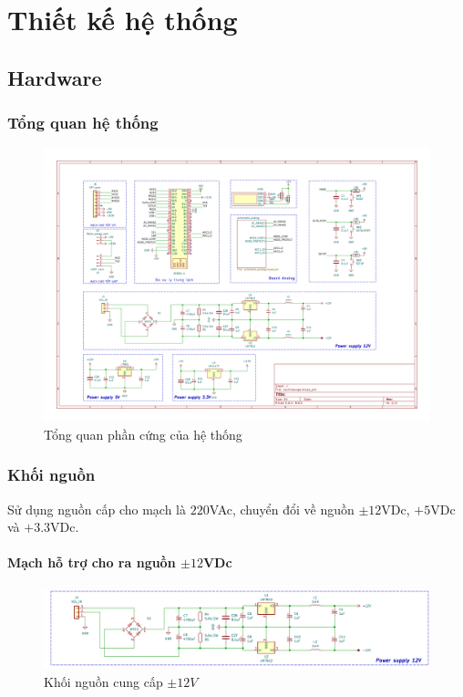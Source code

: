 \fontsize{13}{14}\selectfont
\chapter{Thiết kế hệ thống}
\newpage
\section{Hardware}
	\subsection{Tổng quan hệ thống}
	\begin{figure}[H]
		\includegraphics[width=\linewidth]{./picture/over_hardware.pdf}
		\caption{Tổng quan phần cứng của hệ thống}
		\label{over_hardware}
	\end{figure}
	
	\subsection{Khối nguồn}
	
	Sử dụng nguồn cấp cho mạch là $220$VAc, chuyển đổi về nguồn $\pm 12$VDc, $+5$VDc và $+3.3$VDc.
	
	\subsubsection{Mạch hỗ trợ cho ra nguồn $\pm 12$VDc}
	
	\begin{figure}[H]
		\includegraphics[width=\linewidth]{./picture/power_supply.pdf}
		\caption{Khối nguồn cung cấp $\pm12V$}
		\label{power_supply_hardware}
	\end{figure}
	
